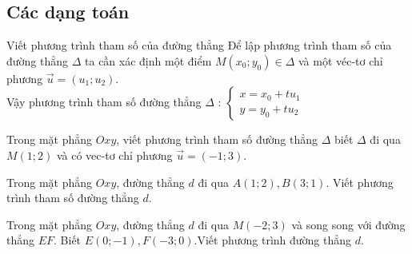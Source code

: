 \subsection{Các dạng toán}
\begin{dang}{Viết phương trình tham số của đường thẳng}
	Để lập phương trình tham số của đường thẳng $\Delta$ ta cần xác định một điểm $M \left(x_0; y_0 \right) \in \Delta$ và một véc-tơ chỉ phương $ \overrightarrow{u} = \left(u_1; u_2 \right)$.\\
	Vậy phương trình tham số đường thẳng $\Delta$ : $\left\{ \begin{array}{l} x = {x_0} + t{u_1}\\ y = {y_0} + t{u_2}\end{array} \right.$
\end{dang}
\begin{vd}%
	Trong mặt phẳng $Oxy$, viết phương trình tham số đường thẳng $\Delta$ biết $\Delta$ đi qua $M(1;2)$ và có vec-tơ chỉ phương $ \overrightarrow{u} = (-1;3)$.
\end{vd}
\begin{vd}%
	Trong mặt phẳng $Oxy$, đường thẳng $d$ đi qua $A \left(1; 2 \right), B \left(3;1 \right)$. Viết phương trình tham số đường thẳng $d$.
\end{vd}
\begin{vd}%
	Trong mặt phẳng $Oxy$, đường thẳng $d$ đi qua $M(-2;3)$ và song song với đường thẳng $EF$. Biết $E(0;-1), F(-3;0)$.Viết phương trình đường thẳng $d$.
\end{vd}
